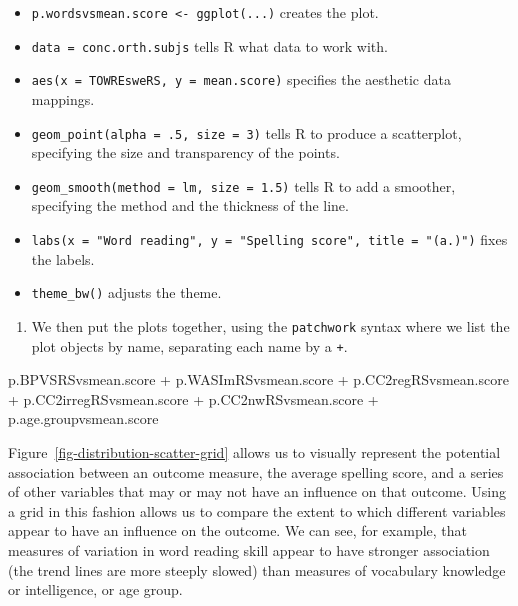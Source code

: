 \documentclass[
  letterpaper,
  DIV=11,
  numbers=noendperiod]{scrreprt}
\newenvironment{Shaded}{\begin{snugshade}}{\end{snugshade}}
\newcommand{\NormalTok}[1]{\textcolor[rgb]{0.00,0.23,0.31}{#1}}
\newcommand{\SpecialCharTok}[1]{\textcolor[rgb]{0.37,0.37,0.37}{#1}}
\providecommand{\tightlist}{%
  \setlength{\itemsep}{0pt}\setlength{\parskip}{0pt}}\usepackage{longtable,booktabs,array}
\begin{document}
\begin{itemize}
\tightlist
\item
  \texttt{p.wordsvsmean.score\ \textless{}-\ ggplot(...)} creates the
  plot.
\item
  \texttt{data\ =\ conc.orth.subjs} tells R what data to work with.
\item
  \texttt{aes(x\ =\ TOWREsweRS,\ y\ =\ mean.score)} specifies the
  aesthetic data mappings.
\item
  \texttt{geom\_point(alpha\ =\ .5,\ size\ =\ 3)} tells R to produce a
  scatterplot, specifying the size and transparency of the points.
\item
  \texttt{geom\_smooth(method\ =\ \textquotesingle{}lm\textquotesingle{},\ size\ =\ 1.5)}
  tells R to add a smoother, specifying the method and the thickness of
  the line.
\item
  \texttt{labs(x\ =\ "Word\ reading",\ y\ =\ "Spelling\ score",\ title\ =\ "(a.)")}
  fixes the labels.
\item
  \texttt{theme\_bw()} adjusts the theme.
\end{itemize}

\begin{enumerate}
\def\labelenumi{\arabic{enumi}.}
\setcounter{enumi}{1}
\tightlist
\item
  We then put the plots together, using the \texttt{patchwork} syntax
  where we list the plot objects by name, separating each name by a
  \texttt{+}.
\end{enumerate}

\begin{Shaded}
\begin{Highlighting}[]
\NormalTok{p.BPVSRSvsmean.score }\SpecialCharTok{+}\NormalTok{ p.WASImRSvsmean.score }\SpecialCharTok{+}\NormalTok{ p.CC2regRSvsmean.score }\SpecialCharTok{+}
\NormalTok{  p.CC2irregRSvsmean.score }\SpecialCharTok{+}\NormalTok{ p.CC2nwRSvsmean.score }\SpecialCharTok{+}\NormalTok{ p.age.groupvsmean.score}
\end{Highlighting}
\end{Shaded}

Figure~\ref{fig-distribution-scatter-grid} allows us to visually
represent the potential association between an outcome measure, the
average spelling score, and a series of other variables that may or may
not have an influence on that outcome. Using a grid in this fashion
allows us to compare the extent to which different variables appear to
have an influence on the outcome. We can see, for example, that measures
of variation in word reading skill appear to have stronger association
(the trend lines are more steeply slowed) than measures of vocabulary
knowledge or intelligence, or age group.
\end{document}
